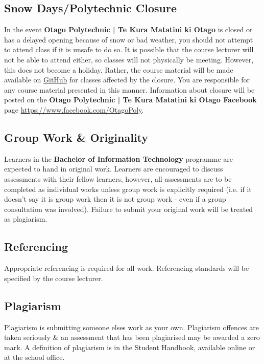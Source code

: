 \documentclass{article}
\begin{document}
\subsection*{Snow Days/Polytechnic Closure}
In the event \textbf{Otago Polytechnic | Te Kura Matatini ki Otago} is closed or has a delayed opening because of snow or bad weather, you should not attempt to attend class if it is unsafe to do so. It is possible that the course lecturer will not be able to attend either, so classes will not physically be meeting. However, this does not become a holiday. Rather, the course material will be made available on \href{https://github.com/otago-polytechnic-bit-courses/ID721001-mobile-application-development}{GitHub} for classes affected by the closure. You are responsible for any course material presented in this manner. Information about closure will be posted on the \textbf{Otago Polytechnic | Te Kura Matatini ki Otago Facebook} page \href{https://www.facebook.com/OtagoPoly}{https://www.facebook.com/OtagoPoly}.

\subsection*{Group Work \& Originality}
Learners in the \textbf{Bachelor of Information Technology} programme are expected to hand in original work. Learners are encouraged to discuss assessments with their fellow learners, however, all assessments are to be completed as individual works unless group work is explicitly required (i.e. if it doesn't say it is group work then it is not group work - even if a group consultation was involved). Failure to submit your original work will be treated as plagiarism.

\subsection*{Referencing}
Appropriate referencing is required for all work. Referencing standards will be specified by the course lecturer.

\subsection*{Plagiarism}
Plagiarism is submitting someone elses work as your own. Plagiarism offences are taken seriously \& an assessment that has been plagiarised may be awarded a zero mark. A definition of plagiarism is in the Student Handbook, available online or at the school office.
\end{document}
